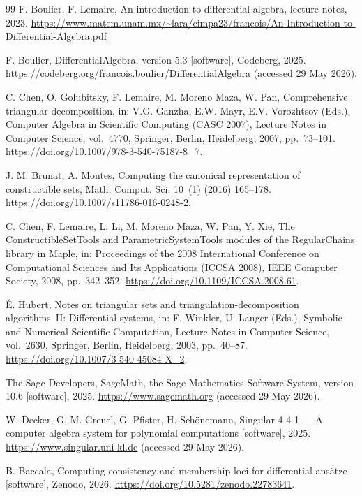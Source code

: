\documentclass{article}
\theoremstyle{definition}
\theoremstyle{plain}
\begin{document}
\begin{thebibliography}{99}
F. Boulier, F. Lemaire, An introduction to differential algebra, lecture notes, 2023.
\url{https://www.matem.unam.mx/~lara/cimpa23/francois/An-Introduction-to-Differential-Algebra.pdf}

F. Boulier, DifferentialAlgebra, version 5.3 [software], Codeberg, 2025. \url{https://codeberg.org/francois.boulier/DifferentialAlgebra} (accessed 29 May 2026).

C. Chen, O. Golubitsky, F. Lemaire, M. Moreno Maza, W. Pan, Comprehensive triangular decomposition, in: V.G. Ganzha, E.W. Mayr, E.V. Vorozhtsov (Eds.), Computer Algebra in Scientific Computing (CASC 2007), Lecture Notes in Computer Science, vol.~4770, Springer, Berlin, Heidelberg, 2007, pp.~73--101. \url{https://doi.org/10.1007/978-3-540-75187-8_7}.

J. M. Brunat, A. Montes, Computing the canonical representation of constructible sets, Math. Comput. Sci. 10~(1) (2016) 165--178. \url{https://doi.org/10.1007/s11786-016-0248-2}.

C. Chen, F. Lemaire, L. Li, M. Moreno Maza, W. Pan, Y. Xie, The ConstructibleSetTools and ParametricSystemTools modules of the RegularChains library in Maple, in: Proceedings of the 2008 International Conference on Computational Sciences and Its Applications (ICCSA 2008), IEEE Computer Society, 2008, pp.~342--352. \url{https://doi.org/10.1109/ICCSA.2008.61}.

\'E. Hubert, Notes on triangular sets and triangulation-decomposition algorithms~II: Differential systems, in: F. Winkler, U. Langer (Eds.), Symbolic and Numerical Scientific Computation, Lecture Notes in Computer Science, vol.~2630, Springer, Berlin, Heidelberg, 2003, pp.~40--87. \url{https://doi.org/10.1007/3-540-45084-X_2}.

The Sage Developers, SageMath, the Sage Mathematics Software System, version 10.6 [software], 2025. \url{https://www.sagemath.org} (accessed 29 May 2026).

W. Decker, G.-M. Greuel, G. Pfister, H. Sch\"onemann, Singular 4-4-1 --- A computer algebra system for polynomial computations [software], 2025. \url{https://www.singular.uni-kl.de} (accessed 29 May 2026).

B. Baccala, Computing consistency and membership loci for differential
ans\"atze [software], Zenodo, 2026.
\url{https://doi.org/10.5281/zenodo.22783641}.


\end{thebibliography}
\end{document}
